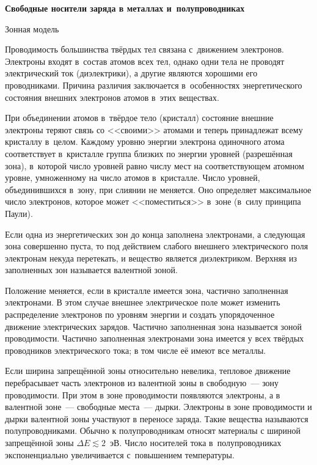 {\large \bf Свободные носители заряда в металлах и~полупроводниках}

{\large  Зонная модель}

Проводимость большинства твёрдых тел связана с~движением электронов. Электроны входят в~состав атомов всех тел, однако одни тела не проводят электрический ток (диэлектрики), а другие являются хорошими его проводниками. Причина различия заключается в~особенностях энергетического состояния внешних электронов атомов в~этих веществах.

При объединении атомов в~твёрдое тело (кристалл) состояние внешние электроны теряют связь со <<своими>> атомами и теперь принадлежат всему кристаллу в~целом. Каждому уровню энергии электрона одиночного атома соответствует в~кристалле группа близких по энергии уровней (разрешённая зона), в~которой число уровней равно числу мест на соответствующем атомном уровне, умноженному на число атомов в~кристалле. Число уровней, объединившихся в~зону, при слиянии не меняется. Оно определяет максимальное число электронов, которое может <<поместиться>> в~зоне (в~силу принципа Паули).

Если одна из энергетических зон до конца заполнена электронами, а следующая зона совершенно пуста, то под действием слабого внешнего электрического поля электронам некуда перетекать, и вещество является \textsf{диэлектриком}. Верхняя из заполненных зон называется {\textsf{валентной зоной}}.

Положение меняется, если в кристалле имеется зона, частично заполненная электронами. В этом случае внешнее электрическое поле может изменить распределение электронов по уровням энергии и создать упорядоченное движение электрических зарядов. Частично заполненная зона называется \textsf{зоной проводимости}. Частично заполненная электронами зона имеется у всех твёрдых проводников электрического тока; в том числе её имеют все металлы.

Если ширина запрещённой зоны относительно невелика, тепловое движение перебрасывает часть электронов из валентной зоны в свободную~--- зону проводимости. При этом в зоне проводимости появляются электроны, а в валентной зоне~--- свободные места~--- \textsf{дырки}. Электроны в зоне проводимости и дырки валентной зоны участвуют в переносе заряда. Такие вещества называются \textsf{полупроводниками}. Обычно к полупроводникам относят материалы с шириной запрещённой зоны $\Delta E \lesssim 2$~эВ. Число носителей тока в~полупроводниках экспоненциально увеличивается с~повышением температуры.

